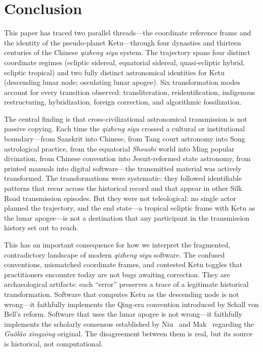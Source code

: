 \documentclass[10pt,a4paper]{article}
\begin{document}
\section{Conclusion}\label{sec:conclusion}

This paper has traced two parallel threads---the coordinate reference frame and
the identity of the pseudo-planet Ketu---through four dynasties and
thirteen centuries of the Chinese \textit{qizheng siyu} system.  The trajectory spans
four distinct coordinate regimes (ecliptic sidereal, equatorial sidereal,
quasi-ecliptic hybrid, ecliptic tropical) and two fully distinct astronomical
identities for Ketu (descending lunar node; osculating lunar apogee).  Six
transformation modes account for every transition observed: transliteration,
reidentification, indigenous restructuring, hybridization, foreign correction,
and algorithmic fossilization.

The central finding is that cross-civilizational astronomical transmission is
not passive copying.  Each time the \textit{qizheng siyu} crossed a cultural or
institutional boundary---from Sanskrit into Chinese, from Tang court astronomy
into Song astrological practice, from the equatorial \textit{Shoushi} world
into Ming popular divination, from Chinese convention into Jesuit-reformed
state astronomy, from printed manuals into digital software---the transmitted
material was actively transformed.  The transformations were systematic: they
followed identifiable patterns that recur across the historical record and that
appear in other Silk Road transmission episodes.  But they were not
teleological: no single actor planned the trajectory, and the end state---a
tropical ecliptic frame with Ketu as the lunar apogee---is not a
destination that any participant in the transmission history set out to reach.

This has an important consequence for how we interpret the fragmented,
contradictory landscape of modern \textit{qizheng siyu} software.  The confused
conventions, mismatched coordinate frames, and contested Ketu toggles that
practitioners encounter today are not bugs awaiting correction.  They are
archaeological artifacts: each ``error'' preserves a trace of a legitimate
historical transformation.  Software that computes Ketu as the descending
node is not wrong---it faithfully implements the Qing-era convention introduced
by Schall von Bell's reform.  Software that uses the lunar apogee is not
wrong---it faithfully implements the scholarly consensus established by
Niu~\cite{niu1995ketu} and Mak~\cite{mak2014pseudoplanets} regarding the
\textit{Gu\v{o}l\v{a}o x\={\i}ngz\={o}ng} original.  The disagreement between them is real, but its source
is historical, not computational.
\end{document}
